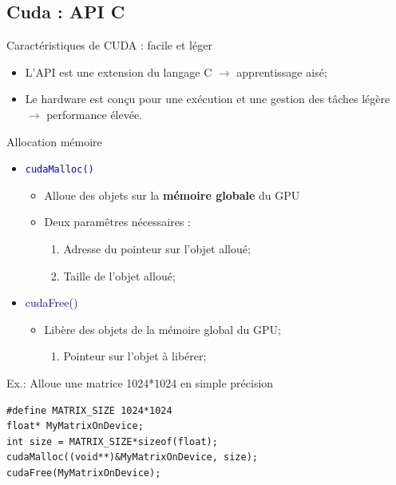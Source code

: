 \documentclass[handout,francais]{beamer}
\begin{document}
\subsection{Cuda : API C}

\begin{frame}{Caractéristiques de CUDA : facile et léger}
\begin{itemize}
\item L'API est une extension du langage C 
  \textcolor{green}{$\rightarrow$} apprentissage aisé;
\item Le hardware est conçu pour une exécution et une gestion des
tâches légère \textcolor{green}{$\rightarrow$} performance élevée.
\end{itemize}
\end{frame}

\begin{frame}[containsverbatim]{Allocation mémoire}
\begin{itemize}
\item \textcolor{blue}{\texttt{cudaMalloc()}}
  \begin{itemize}
  \item Alloue des objets sur la \textbf{mémoire globale} du GPU
  \item Deux paramêtres nécessaires :
    \begin{enumerate}
    \item Adresse du pointeur sur l'objet alloué;
    \item Taille de l'objet alloué;
    \end{enumerate}
  \end{itemize}
\item \textcolor{blue}{cudaFree()}
  \begin{itemize}
  \item Libère des objets de la mémoire global du GPU;
    \begin{enumerate}
    \item Pointeur sur l'objet à libérer;
    \end{enumerate}
  \end{itemize}
\end{itemize}

\begin{exampleblock}{Ex.: Alloue une matrice 1024*1024 en simple précision}
    \begin{lstlisting}
#define MATRIX_SIZE 1024*1024
float* MyMatrixOnDevice;
int size = MATRIX_SIZE*sizeof(float);
cudaMalloc((void**)&MyMatrixOnDevice, size);
cudaFree(MyMatrixOnDevice);
    \end{lstlisting}
\end{exampleblock}
\end{frame}
\end{document}
